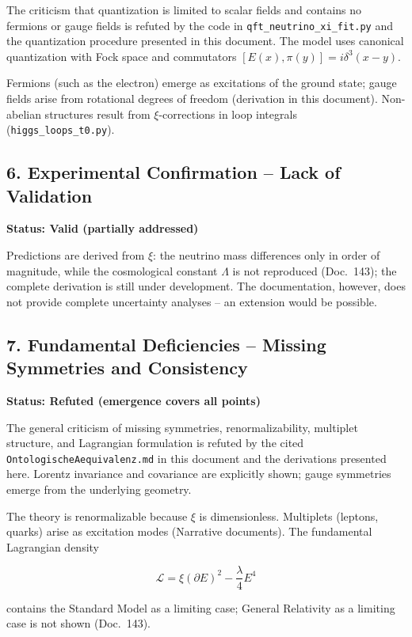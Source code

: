 	The criticism that quantization is limited to scalar fields and contains no fermions or gauge fields is refuted by the code in \texttt{qft\_neutrino\_xi\_fit.py} and the quantization procedure presented in this document. The model uses canonical quantization with Fock space and commutators \([E(x), \pi(y)] = i\delta^3(x-y)\).
	
	Fermions (such as the electron) emerge as excitations of the ground state; gauge fields arise from rotational degrees of freedom (derivation in this document). Non-abelian structures result from \(\xi\)-corrections in loop integrals (\texttt{higgs\_loops\_t0.py}).
	
	\subsection{6. Experimental Confirmation – Lack of Validation}
	\textbf{Status: Valid (partially addressed)}
	
Predictions are derived from $\xi$: the neutrino mass differences only in order of magnitude, while the cosmological constant \(\Lambda\) is not reproduced (Doc.~143); the complete derivation is still under development. The documentation, however, does not provide complete uncertainty analyses – an extension would be possible.
	
	\subsection{7. Fundamental Deficiencies – Missing Symmetries and Consistency}
	\textbf{Status: Refuted (emergence covers all points)}
	
	The general criticism of missing symmetries, renormalizability, multiplet structure, and Lagrangian formulation is refuted by the cited \texttt{OntologischeAequivalenz.md} in this document and the derivations presented here. Lorentz invariance and covariance are explicitly shown; gauge symmetries emerge from the underlying geometry.
	
	The theory is renormalizable because \(\xi\) is dimensionless. Multiplets (leptons, quarks) arise as excitation modes (Narrative documents). The fundamental Lagrangian density
	
	\[
	\mathcal{L} = \xi (\partial E)^2 - \frac{\lambda}{4} E^4
	\]
	
	contains the Standard Model as a limiting case; General Relativity as a limiting case is not shown (Doc.~143).